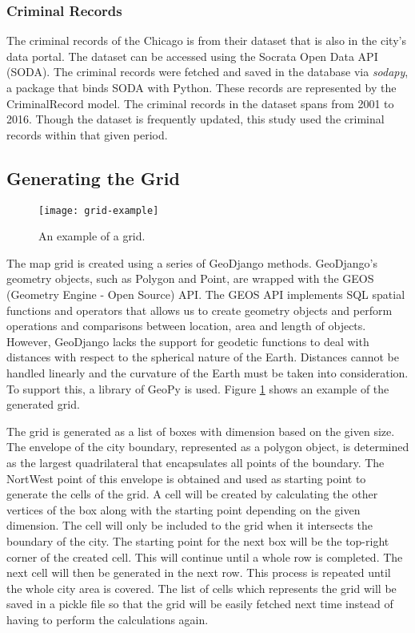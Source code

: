    \subsubsection{Criminal Records}
        The criminal records of the Chicago is from their dataset that is also in the city's data portal. The dataset can be accessed using the Socrata Open Data API (SODA). The criminal records were fetched and saved in the database via \textit{sodapy}, a package that binds SODA with Python. These records are represented by the CriminalRecord model. The criminal records in the dataset spans from 2001 to 2016. Though the dataset is frequently updated, this study used the criminal records within that given period.

\subsection{Generating the Grid}
    \begin{figure}[H]
    \centering
    \texttt{[image: grid-example]}
    \caption{An example of a grid.}
    \label{fig:grid}
    \end{figure}
    The map grid is created using a series of GeoDjango methods. GeoDjango's geometry objects, such as Polygon and Point, are wrapped with the GEOS (Geometry Engine - Open Source) API. The GEOS API implements SQL spatial functions and operators that allows us to create geometry objects and perform operations and comparisons between location, area and length of objects. However, GeoDjango lacks the support for geodetic functions to deal with distances with respect to the spherical nature of the Earth. Distances cannot be handled linearly and the curvature of the Earth must be taken into consideration. To support this, a library of GeoPy is used. Figure \ref{fig:grid} shows an example of the generated grid.

    The grid is generated as a list of boxes with dimension based on the given size. The envelope of the city boundary, represented as a polygon object, is determined as the largest quadrilateral that encapsulates all points of the boundary. The NortWest point of this envelope is obtained and used as starting point to generate the cells of the grid. A cell will be created by calculating the other vertices of the box along with the starting point depending on the given dimension. The cell will only be included to the grid when it intersects the boundary of the city. The starting point for the next box will be the top-right corner of the created cell. This will continue until a whole row is completed. The next cell will then be generated in the next row. This process is repeated until the whole city area is covered. The list of cells which represents the grid will be saved in a pickle file so that the grid will be easily fetched next time instead of having to perform the calculations again.


